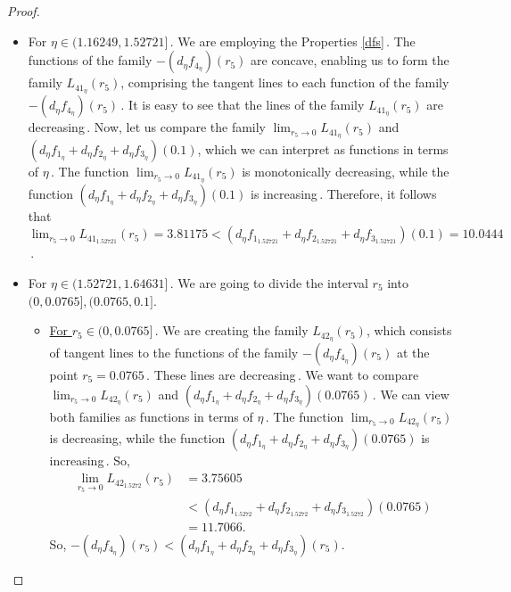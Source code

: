 \documentclass[final,11pt]{article}
\numberwithin{equation}{section}
\theoremstyle{definition}
\begin{document}
\begin{proof}
\begin{itemize}
\begin{itemize}
\begin{itemize}
\item For $\eta\in(1.16249,1.52721]$\,. We are employing the Properties \ref{dfs}\,. The functions of the family $-\left(d_{\eta}f_{4_{\eta}}\right)(r_{5})$ are concave, enabling us to form the family $L_{41_{\eta}}(r_{5})$, comprising the tangent lines to each function of the family $-\left(d_{\eta}f_{4_{\eta}}\right) (r_{5})$\,. It is easy to see that the lines of the family $L_{41_{\eta}}(r_{5})$ are decreasing\,. Now, let us compare the family $\displaystyle\lim_{r_{5}\rightarrow 0}L_ {41_{\eta}}(r_{5})$ and $\left(d_{\eta}f_{1_{\eta}}+d_{\eta}f_{2_{\eta} }+d_{\eta}f_{3_{\eta}}\right)(0.1)$, which we can interpret as functions in terms of $\eta$\,. The function $\displaystyle\lim_{r_{5}\rightarrow 0}L_{41_{\eta}}(r_{5})$ is monotonically decreasing, while the function $\left(d_{\eta}f_{ 1_{\eta}}+d_{\eta}f_{2_{\eta} }+d_{\eta}f_{3_{\eta}}\right)(0.1)$ is increasing\,. Therefore, it follows that $\displaystyle\lim_{r_{5}\rightarrow 0}L_{41_{1.52721}}(r_{5})=3.81175<\left(d_{\eta}f_{1_{1.52721}}+d_{\eta}f_{2_{1.52721}}+d_{\eta}f_{3_{1.52721}}\right)(0.1)=10.0444$\,. %
\item For $\eta\in(1.52721,1.64631]$\,. We are going to divide the interval $r_{5}$ into $(0,0.0765], (0.0765,0.1]$.
\begin{itemize}
\item \underline{For $r_{5}\in(0,0.0765]$}\,. We are creating the family $L_{42_{\eta}}(r_{5})$, which consists of tangent lines to the functions of the family $-\left(d_{\eta}f_{4_{\eta}}\right)(r_{5})$ at the point $r_{5}=0.0765$\,. These lines are decreasing\,. We want to compare $\displaystyle{\lim _{r_{5}\rightarrow 0}L_{42_{\eta}}(r_{5})}$ and $\left(d_{\eta} f_{1_{\eta}}+d_{\eta}f_{2_{\eta}}+d_{\eta}f_{3_{\eta}}\right)(0.0765)$\,. We can view both families as functions in terms of $\eta$\,. The function $\displaystyle{\lim_{r_{5}\rightarrow 0}L_{42_{\eta}}(r_{5})}$ is decreasing, while the function $\left(d_{\eta} f_{1_{\eta}}+d_{\eta}f_{2_{\eta}}+d_{\eta}f_{3_{\eta}}\right)(0.0765)$ is increasing\,. So,
\begin{equation*}
\begin{split}
\lim_{r_{5}\rightarrow 0}L_{42_{1.5272}}(r_{5})&=3.75605\\
&<\left(d_{\eta}f_{1_{1.5272}}+d_{\eta}f_{2_{1.5272} }+d_{\eta}f_{3_{1.5272}}\right)(0.0765)\\&=11.7066.
\end{split}
\end{equation*}
So, $-\left(d_{\eta}f_{4_{\eta}}\right) (r_{5})<\left(d_{\eta}f_{1_{\eta}}+d_{\eta}f_{2_{\eta} }+d_{\eta}f_{3_{\eta}}\right)(r_{5})$.


\end{itemize}
\end{itemize}
\end{itemize}
\end{itemize}
\end{proof}
\end{document}
